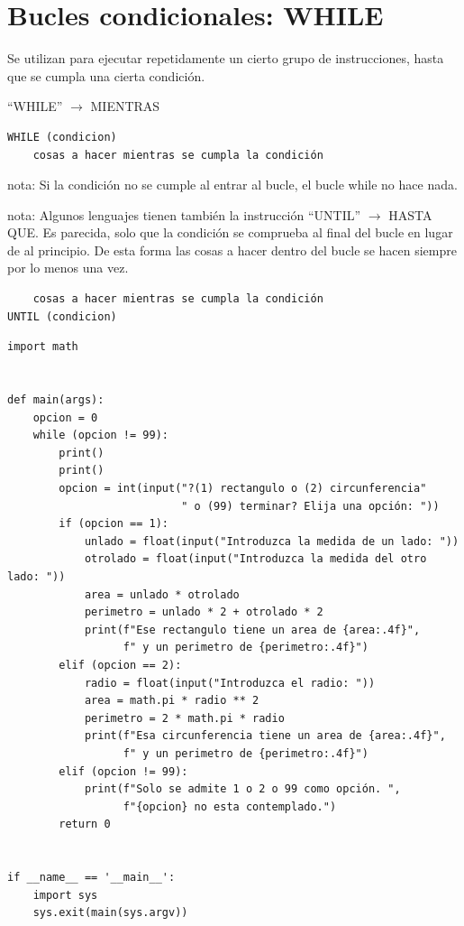 \documentclass[spanish,12pt,a4paper,final,oneside]{book}
\begin{document}
\section{Bucles condicionales: WHILE}
Se utilizan para ejecutar repetidamente un cierto grupo de instrucciones, hasta que se cumpla una cierta condición.

``WHILE'' $\rightarrow$ MIENTRAS
\begin{lstlisting}
WHILE (condicion)
    cosas a hacer mientras se cumpla la condición
\end{lstlisting}
nota: Si la condición no se cumple al entrar al bucle, el bucle while no hace nada.

nota: Algunos lenguajes  tienen también la instrucción ``UNTIL'' $\rightarrow$ HASTA QUE. Es parecida, solo que la condición se comprueba al final del bucle en lugar de al principio. De esta forma las cosas a hacer dentro del bucle se hacen siempre por lo menos una vez.
\begin{lstlisting}
    cosas a hacer mientras se cumpla la condición
UNTIL (condicion)
\end{lstlisting}


\begin{lstlisting}[frame=single, caption=lenguaje python]
import math


def main(args):
    opcion = 0
    while (opcion != 99):
        print()
        print()
        opcion = int(input("?(1) rectangulo o (2) circunferencia"
                           " o (99) terminar? Elija una opción: "))
        if (opcion == 1):
            unlado = float(input("Introduzca la medida de un lado: "))
            otrolado = float(input("Introduzca la medida del otro lado: "))
            area = unlado * otrolado
            perimetro = unlado * 2 + otrolado * 2
            print(f"Ese rectangulo tiene un area de {area:.4f}",
                  f" y un perimetro de {perimetro:.4f}")
        elif (opcion == 2):
            radio = float(input("Introduzca el radio: "))
            area = math.pi * radio ** 2
            perimetro = 2 * math.pi * radio
            print(f"Esa circunferencia tiene un area de {area:.4f}",
                  f" y un perimetro de {perimetro:.4f}")
        elif (opcion != 99):
            print(f"Solo se admite 1 o 2 o 99 como opción. ",
                  f"{opcion} no esta contemplado.")
        return 0


if __name__ == '__main__':
    import sys
    sys.exit(main(sys.argv))
\end{lstlisting}
\end{document}
